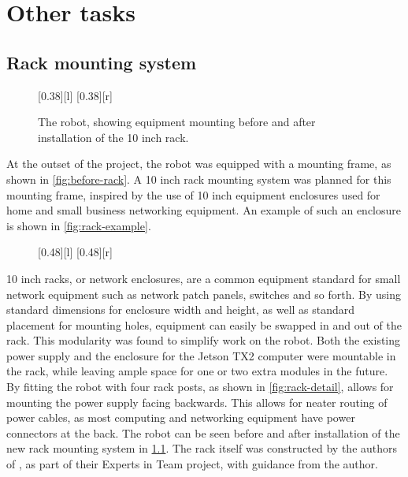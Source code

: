\documentclass[\rootfolder/main.tex]{subfiles}
\begin{document}
\chapter{Other tasks}

\label{ch:other-tasks} %


\section{Rack mounting system}

\begin{figure}[h]
    \centering
    [0.38\columnwidth][l]{}
    [0.38\columnwidth][r]{}
    \caption{The robot, showing equipment mounting before and after installation of the 10 inch rack.\label{fig:before-after-rack}}
\end{figure}

At the outset of the project, the robot was equipped with a mounting frame, as shown in \cref{fig:before-rack}.
A 10 inch rack mounting system was planned for this mounting frame, inspired by the use of 10 inch equipment enclosures used for home and small business networking equipment.
An example of such an enclosure is shown in \cref{fig:rack-example}.

\begin{figure}[h]
    [0.48\columnwidth][l]{}
    [0.48\columnwidth][r]{}
\end{figure}

10 inch racks, or network enclosures, are a common equipment standard for small network equipment such as network patch panels, switches and so forth.
By using standard dimensions for enclosure width and height, as well as standard placement for mounting holes, equipment can easily be swapped in and out of the rack.
This modularity was found to simplify work on the robot. 
Both the existing power supply and the enclosure for the Jetson TX2 computer were mountable in the rack, while leaving ample space for one or two extra modules in the future.
By fitting the robot with four rack posts, as shown in \cref{fig:rack-detail}, allows for mounting the power supply facing backwards.
This allows for neater routing of power cables, as most computing and networking equipment have power connectors at the back.
The robot can be seen before and after installation of the new rack mounting system in \cref{fig:before-after-rack}.
The rack itself was constructed by the authors of \cite{Johansen2018}, as part of their Experts in Team project, with guidance from the author.
\end{document}
